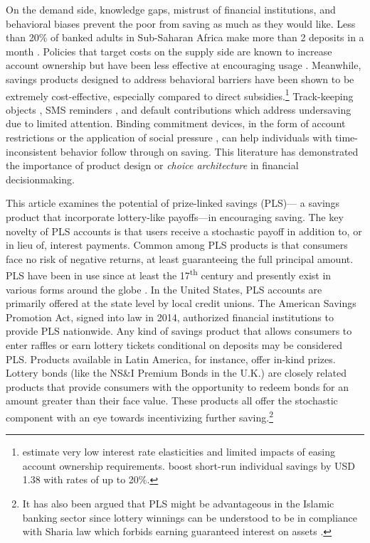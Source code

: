 \documentclass[11pt]{article}
\begin{document}
	On the demand side, knowledge gaps, mistrust of financial institutions, and behavioral biases prevent the poor from saving as much as they would like. Less than 20\% of banked adults in Sub-Saharan Africa make more than 2 deposits in a month \parencite{demirguc-kunt_global_2015}. Policies that target costs on the supply side are known to increase account ownership but have been less effective at encouraging usage \parencite{dupas_why_2013,karlan_banking_2016}. Meanwhile, savings products designed to address behavioral barriers have been shown to be extremely cost-effective, especially compared to direct subsidies.\footnote{\textcite{karlan_price_2018} estimate very low interest rate elasticities and limited impacts of easing account ownership requirements. \textcite{schaner_persistent_2018} boost short-run individual savings by USD 1.38 with rates of up to 20\%.} Track-keeping objects \parencite{akbas_how_2016}, SMS reminders \parencite{karlan_getting_2010}, and default contributions \parencite{thaler_save_2004,chetty_active_2014,somville_saving_2018} which address undersaving due to limited attention. Binding commitment devices, in the form of account restrictions \parencite{ashraf_tying_2006} or the application of social pressure \parencite{dupas_why_2013}, can help individuals with time-inconsistent behavior follow through on saving. This literature has demonstrated the importance of product design or \textit{choice architecture} in financial decisionmaking.

	This article examines the potential of prize-linked savings (PLS)--- a savings product that incorporate lottery-like payoffs---in encouraging saving. The key novelty of PLS accounts is that users receive a stochastic payoff in addition to, or in lieu of, interest payments. Common among PLS products is that consumers face no risk of negative returns, at least guaranteeing the full principal amount. PLS have been in use since at least the 17\textsuperscript{th} century and presently exist in various forms around the globe \parencite{murphy_lotteries_2005,kearney_making_2010}. In the United States, PLS accounts are primarily offered at the state level by local credit unions. The American Savings Promotion Act, signed into law in 2014, authorized financial institutions to provide PLS nationwide. Any kind of savings product that allows consumers to enter raffles or earn lottery tickets conditional on deposits may be considered PLS. Products available in Latin America, for instance, offer in-kind prizes. Lottery bonds (like the NS\&I Premium Bonds in the U.K.) are closely related products that provide consumers with the opportunity to redeem bonds for an amount greater than their face value. These products all offer the stochastic component with an eye towards incentivizing further saving.\footnote{It has also been argued that PLS might be advantageous in the Islamic banking sector since lottery winnings can be understood to be in compliance with Sharia law which forbids earning guaranteed interest on assets \parencite{ruth_how_2018}.}
\end{document}
